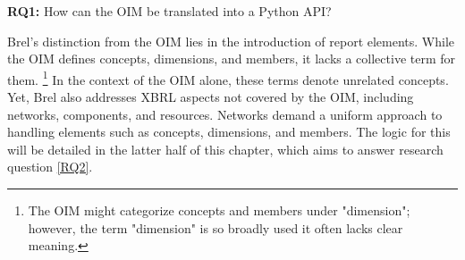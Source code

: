 \begin{displayquote}
    \textbf{RQ1:} How can the OIM be translated into a Python API?
\end{displayquote}

Brel's distinction from the OIM lies in the introduction of report elements.
While the OIM defines concepts, dimensions, and members, it lacks a collective term for them.
\footnote{The OIM might categorize concepts and members under "dimension"; however, the term "dimension" is so broadly used it often lacks clear meaning.}
In the context of the OIM alone, these terms denote unrelated concepts.
Yet, Brel also addresses XBRL aspects not covered by the OIM, including networks, components, and resources.
Networks demand a uniform approach to handling elements such as concepts, dimensions, and members.
The logic for this will be detailed in the latter half of this chapter, which aims to answer research question \ref{RQ2}.


